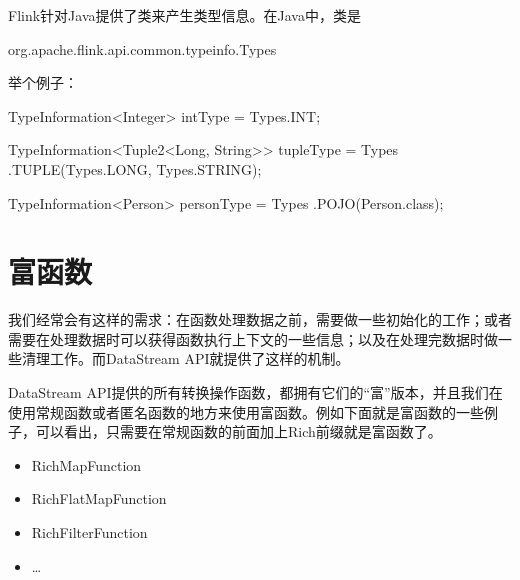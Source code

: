 \documentclass[cn,11pt,chinese]{elegantbook}
\newenvironment{Shaded}{}{}
\newcommand{\BuiltInTok}[1]{#1}
\newcommand{\FunctionTok}[1]{\textcolor[rgb]{0.02,0.16,0.49}{#1}}
\newcommand{\NormalTok}[1]{#1}
\providecommand{\tightlist}{%
  \setlength{\itemsep}{0pt}\setlength{\parskip}{0pt}}
\begin{document}
Flink针对Java提供了类来产生类型信息。在Java中，类是

\begin{Shaded}
\begin{Highlighting}[]
\NormalTok{org.}\FunctionTok{apache}\NormalTok{.}\FunctionTok{flink}\NormalTok{.}\FunctionTok{api}\NormalTok{.}\FunctionTok{common}\NormalTok{.}\FunctionTok{typeinfo}\NormalTok{.}\FunctionTok{Types}
\end{Highlighting}
\end{Shaded}

举个例子：

\begin{Shaded}
\begin{Highlighting}[]
\NormalTok{TypeInformation\textless{}}\BuiltInTok{Integer}\NormalTok{\textgreater{} intType = }\BuiltInTok{Types}\NormalTok{.}\FunctionTok{INT}\NormalTok{;}

\NormalTok{TypeInformation\textless{}Tuple2\textless{}}\BuiltInTok{Long}\NormalTok{, }\BuiltInTok{String}\NormalTok{\textgreater{}\textgreater{} tupleType = }\BuiltInTok{Types}
\NormalTok{  .}\FunctionTok{TUPLE}\NormalTok{(}\BuiltInTok{Types}\NormalTok{.}\FunctionTok{LONG}\NormalTok{, }\BuiltInTok{Types}\NormalTok{.}\FunctionTok{STRING}\NormalTok{);}

\NormalTok{TypeInformation\textless{}Person\textgreater{} personType = }\BuiltInTok{Types}
\NormalTok{  .}\FunctionTok{POJO}\NormalTok{(Person.}\FunctionTok{class}\NormalTok{);}
\end{Highlighting}
\end{Shaded}

\hypertarget{ux5bccux51fdux6570}{%
\section{富函数}\label{ux5bccux51fdux6570}}

我们经常会有这样的需求：在函数处理数据之前，需要做一些初始化的工作；或者需要在处理数据时可以获得函数执行上下文的一些信息；以及在处理完数据时做一些清理工作。而DataStream
API就提供了这样的机制。

DataStream
API提供的所有转换操作函数，都拥有它们的``富''版本，并且我们在使用常规函数或者匿名函数的地方来使用富函数。例如下面就是富函数的一些例子，可以看出，只需要在常规函数的前面加上Rich前缀就是富函数了。

\begin{itemize}
\tightlist
\item
  RichMapFunction
\item
  RichFlatMapFunction
\item
  RichFilterFunction
\item
  \ldots{}
\end{itemize}
\end{document}
